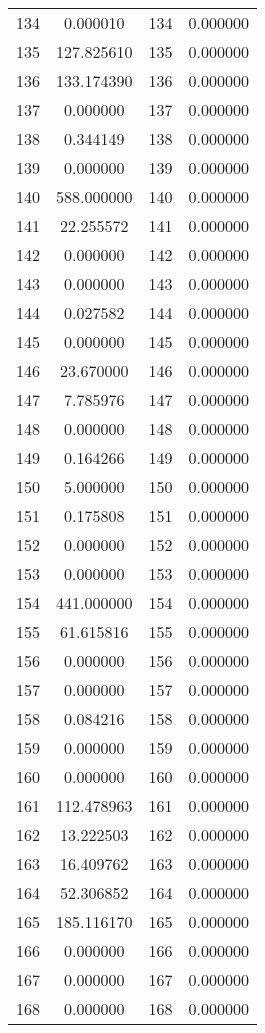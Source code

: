 \documentclass[12pt]{article}
\begin{document}
\begin{longtable}{@{}cccc@{}}
134 & 0.000010 & 134 & 0.000000 \\
135 & 127.825610 & 135 & 0.000000 \\
136 & 133.174390 & 136 & 0.000000 \\
137 & 0.000000 & 137 & 0.000000 \\
138 & 0.344149 & 138 & 0.000000 \\
139 & 0.000000 & 139 & 0.000000 \\
140 & 588.000000 & 140 & 0.000000 \\
141 & 22.255572 & 141 & 0.000000 \\
142 & 0.000000 & 142 & 0.000000 \\
143 & 0.000000 & 143 & 0.000000 \\
144 & 0.027582 & 144 & 0.000000 \\
145 & 0.000000 & 145 & 0.000000 \\
146 & 23.670000 & 146 & 0.000000 \\
147 & 7.785976 & 147 & 0.000000 \\
148 & 0.000000 & 148 & 0.000000 \\
149 & 0.164266 & 149 & 0.000000 \\
150 & 5.000000 & 150 & 0.000000 \\
151 & 0.175808 & 151 & 0.000000 \\
152 & 0.000000 & 152 & 0.000000 \\
153 & 0.000000 & 153 & 0.000000 \\
154 & 441.000000 & 154 & 0.000000 \\
155 & 61.615816 & 155 & 0.000000 \\
156 & 0.000000 & 156 & 0.000000 \\
157 & 0.000000 & 157 & 0.000000 \\
158 & 0.084216 & 158 & 0.000000 \\
159 & 0.000000 & 159 & 0.000000 \\
160 & 0.000000 & 160 & 0.000000 \\
161 & 112.478963 & 161 & 0.000000 \\
162 & 13.222503 & 162 & 0.000000 \\
163 & 16.409762 & 163 & 0.000000 \\
164 & 52.306852 & 164 & 0.000000 \\
165 & 185.116170 & 165 & 0.000000 \\
166 & 0.000000 & 166 & 0.000000 \\
167 & 0.000000 & 167 & 0.000000 \\
168 & 0.000000 & 168 & 0.000000 \\

\end{longtable}
\end{document}
